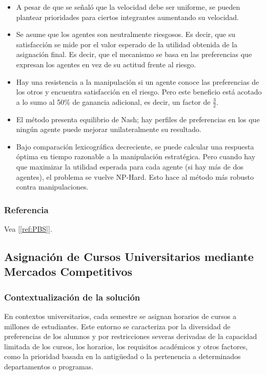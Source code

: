 \documentclass{article}
\begin{document}
\begin{itemize}
  \item A pesar de que se señaló que la velocidad debe ser uniforme, se pueden plantear prioridades para
        ciertos integrantes aumentando su velocidad.
  \item Se asume que los agentes son neutralmente riesgosos. Es decir, que su satisfacción se mide 
        por el valor esperado de la utilidad obtenida de la asignación final. Es decir, que el mecanismo
        se basa en las preferencias que expresan los agentes en vez de su actitud frente al riesgo.
  \item Hay una resistencia a la manipulación si un agente conoce las preferencias de los otros
        y encuentra satisfacción en el riesgo. Pero este beneficio está acotado a lo sumo al 50\% de
        ganancia adicional, es decir, un factor de $\frac{3}{2}$.
  \item El método presenta equilibrio de Nash; hay perfiles de preferencias en los que ningún agente 
        puede mejorar unilateralmente su resultado.
  \item Bajo comparación lexicográfica decreciente, se puede calcular una respuesta óptima en tiempo 
        razonable a la manipulación estratégica. Pero cuando hay que maximizar la utilidad esperada
        para cada agente (si hay más de dos agentes), el problema se vuelve NP-Hard. Esto hace al 
        método más robusto contra manipulaciones.
\end{itemize}


\subsubsection{Referencia}
Vea [\ref{ref:PBS}].

\subsection{Asignación de Cursos Universitarios mediante Mercados Competitivos}

\subsubsection{Contextualización de la solución}

En contextos universitarios, cada semestre se asignan horarios de cursos a millones de estudiantes. Este entorno se caracteriza por la diversidad de preferencias de los alumnos y por restricciones severas derivadas de la capacidad limitada de los cursos, los horarios, los requisitos académicos y otros factores, como la prioridad basada en la antigüedad o la pertenencia a determinados departamentos o programas.
\end{document}
